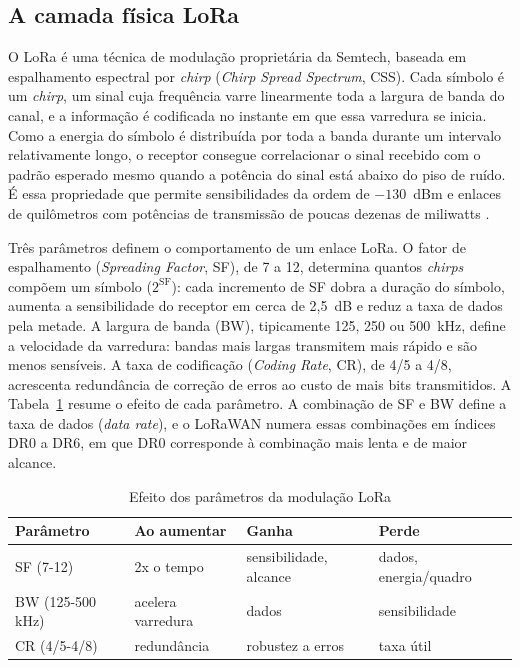 
\subsection{A camada física LoRa}
\label{subsec:camada_fisica_lora}

O LoRa é uma técnica de modulação proprietária da Semtech, baseada em espalhamento espectral por \textit{chirp} (\textit{Chirp Spread Spectrum}, CSS). Cada símbolo é um \textit{chirp}, um sinal cuja frequência varre linearmente toda a largura de banda do canal, e a informação é codificada no instante em que essa varredura se inicia. Como a energia do símbolo é distribuída por toda a banda durante um intervalo relativamente longo, o receptor consegue correlacionar o sinal recebido com o padrão esperado mesmo quando a potência do sinal está abaixo do piso de ruído. É essa propriedade que permite sensibilidades da ordem de $-130$~dBm e enlaces de quilômetros com potências de transmissão de poucas dezenas de miliwatts \cite{semtech2015sx1276}.

Três parâmetros definem o comportamento de um enlace LoRa. O fator de espalhamento (\textit{Spreading Factor}, SF), de 7 a 12, determina quantos \textit{chirps} compõem um símbolo ($2^{\mathrm{SF}}$): cada incremento de SF dobra a duração do símbolo, aumenta a sensibilidade do receptor em cerca de 2,5~dB e reduz a taxa de dados pela metade. A largura de banda (BW), tipicamente 125, 250 ou 500~kHz, define a velocidade da varredura: bandas mais largas transmitem mais rápido e são menos sensíveis. A taxa de codificação (\textit{Coding Rate}, CR), de 4/5 a 4/8, acrescenta redundância de correção de erros ao custo de mais bits transmitidos. A Tabela~\ref{tab:parametros_lora} resume o efeito de cada parâmetro. A combinação de SF e BW define a taxa de dados (\textit{data rate}), e o LoRaWAN numera essas combinações em índices DR0 a DR6, em que DR0 corresponde à combinação mais lenta e de maior alcance.

\begin{table}[htb]
\centering
\caption{Efeito dos parâmetros da modulação LoRa}
\label{tab:parametros_lora}
\begin{tabular}{llll}
\hline
\textbf{Parâmetro} & \textbf{Ao aumentar} & \textbf{Ganha} & \textbf{Perde} \\
\hline
SF (7-12)   & 2x o tempo & sensibilidade, alcance & dados, energia/quadro \\
BW (125-500 kHz) & acelera varredura & dados & sensibilidade \\
CR (4/5-4/8) & redundância & robustez a erros & taxa útil \\
\hline
\end{tabular}
\end{table}

